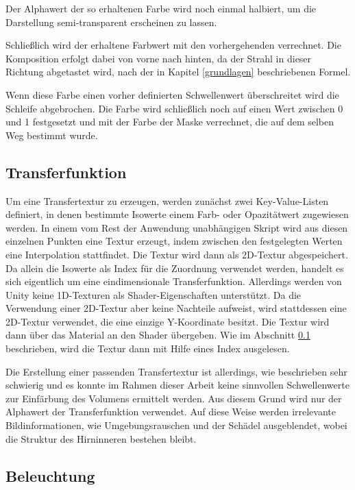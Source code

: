 Der Alphawert der so erhaltenen Farbe wird noch einmal halbiert, um die Darstellung semi-transparent erscheinen zu lassen.

Schließlich wird der erhaltene Farbwert mit den vorhergehenden verrechnet. Die Komposition erfolgt dabei von vorne nach hinten, da der Strahl in dieser Richtung abgetastet wird, nach der in Kapitel \ref{grundlagen} beschriebenen Formel.

Wenn diese Farbe einen vorher definierten Schwellenwert überschreitet wird die Schleife abgebrochen. 
Die Farbe wird schließlich noch auf einen Wert zwischen 0 und 1 festgesetzt und mit der Farbe der Maske verrechnet, die auf dem selben Weg bestimmt wurde.

\subsection{Transferfunktion}
\label{transfer}

Um eine Transfertextur zu erzeugen, werden zunächst zwei Key-Value-Listen definiert, in denen bestimmte Isowerte einem Farb- oder Opazitätwert zugewiesen werden. In einem vom Rest der Anwendung unabhängigen Skript wird aus diesen einzelnen Punkten eine Textur erzeugt, indem zwischen den festgelegten Werten eine Interpolation stattfindet.
Die Textur wird dann als 2D-Textur abgespeichert. Da allein die Isowerte als Index für die Zuordnung verwendet werden, handelt es sich eigentlich um eine eindimensionale Transferfunktion. 
Allerdings werden von Unity keine 1D-Texturen als Shader-Eigenschaften unterstützt. Da die Verwendung einer 2D-Textur aber keine Nachteile aufweist, wird stattdessen eine 2D-Textur verwendet, die eine einzige Y-Koordinate besitzt. 
Die Textur wird dann über das Material an den Shader übergeben. Wie im Abschnitt \ref{transfer} beschrieben, wird die Textur dann mit Hilfe eines Index ausgelesen.

Die Erstellung einer passenden Transfertextur ist allerdings, wie beschrieben sehr schwierig und es konnte im Rahmen dieser Arbeit keine sinnvollen Schwellenwerte zur Einfärbung des Volumens ermittelt werden. Aus diesem Grund wird nur der Alphawert der Transferfunktion verwendet. Auf diese Weise werden irrelevante Bildinformationen, wie Umgebungsrauschen und der Schädel ausgeblendet, wobei die Struktur des Hirninneren bestehen bleibt. 

\subsection{Beleuchtung}
\label{illumination}

